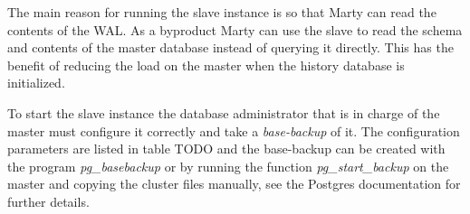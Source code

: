 The main reason for running the slave instance is so that Marty can read the contents of the WAL.
As a byproduct Marty can use the slave to read the schema and contents of the master database instead of querying it directly.
This has the benefit of reducing the load on the master when the history database is initialized.

To start the slave instance the database administrator that is in charge of the master must configure it correctly and take a \textit{base-backup} of it.
The configuration parameters are listed in table TODO and the base-backup can be created with the program \textit{pg\_basebackup} or by running the function \textit{pg\_start\_backup} on the master and copying the cluster files manually, see the Postgres documentation for further details. %

